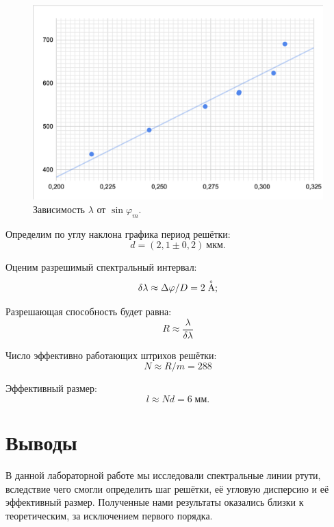 \documentclass[a4paper, 12pt]{article}%
\begin{document}
			\begin{figure}[h]
	\includegraphics[scale=0.55]{graph1.pdf}
	\centering
	\caption{Зависимость $\lambda$ от $\sin \varphi_m$.}
	\end{figure}
	
		Определим по углу наклона графика период решётки:
		\begin{equation}
			d = (2,1\pm 0,2) \ \text{мкм}.
		\end{equation}
		\textbf{       }
	
		Оценим разрешимый спектральный интервал:
		\begin{equation}
			\delta\lambda \approx \Delta\varphi/D = 2 \buildrel _{\circ} \over {\mathrm{A}};
		\end{equation}
		\textbf{       }
		
		Разрешающая способность будет равна:
		\begin{equation}
			R \approx \frac{\lambda}{\delta\lambda}
		\end{equation}
		\textbf{       }
		
		Число эффективно работающих штрихов решётки:
		\begin{equation}
			N \approx R/m = 288
		\end{equation}
		\textbf{       }
		
		Эффективный размер:
		\begin{equation}
			l \approx Nd = 6\; \text{мм.}
		\end{equation}
		
\section{Выводы}
	В данной лабораторной работе мы исследовали спектральные линии ртути, вследствие чего смогли определить шаг решётки, её угловую дисперсию и её эффективный размер. Полученные нами результаты оказались близки к теоретическим, за исключением первого порядка.
\end{document}
